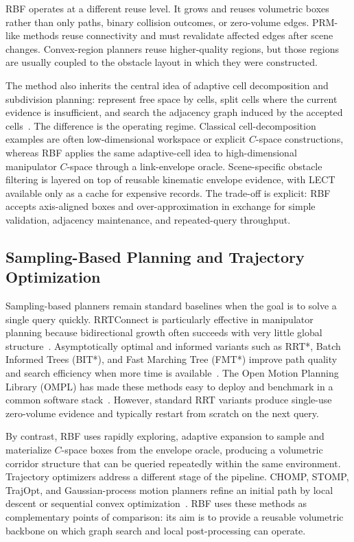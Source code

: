 \documentclass[journal]{IEEEtran}
\DeclareRobustCommand{\textsc}[1]{\textnormal{\MakeUppercase{#1}}}
\newcommand{\rbf}{\textsc{RBF}}
\begin{document}
\rbf{} operates at a different reuse level. It grows and reuses volumetric boxes
rather than only paths, binary collision outcomes, or zero-volume edges.
PRM-like methods reuse connectivity and must revalidate affected edges after
scene changes. Convex-region planners reuse higher-quality regions, but those
regions are usually coupled to the obstacle layout in which they were
constructed.

The method also inherits the central idea of adaptive cell decomposition and
subdivision planning: represent free space by cells, split cells where the
current evidence is insufficient, and search the adjacency graph induced by the
accepted cells~\cite{lozanoperez1983spatial,brooks1985subdivision}. The
difference is the operating regime. Classical cell-decomposition examples are
often low-dimensional workspace or explicit $C$-space constructions, whereas
\rbf{} applies the same adaptive-cell idea to high-dimensional manipulator
$C$-space through a link-envelope oracle. Scene-specific obstacle filtering
is layered on top of reusable kinematic envelope evidence, with LECT available
only as a cache for expensive records. The trade-off is explicit: \rbf{} accepts
axis-aligned boxes and over-approximation in exchange for simple validation,
adjacency maintenance, and repeated-query throughput.

\subsection{Sampling-Based Planning and Trajectory Optimization}

Sampling-based planners remain standard baselines when the goal is to solve
a single query quickly. RRTConnect is particularly effective in manipulator
planning because bidirectional growth often succeeds with very little global
structure~\cite{kuffner2000rrt}. Asymptotically optimal and
informed variants such as RRT*, Batch Informed Trees (BIT*), and Fast Marching
Tree (FMT*) improve path quality and search efficiency when more time is
available~\cite{karaman2011sampling,
gammell2015batch,gammell2018informed,janson2015fmt}. The Open Motion Planning
Library (OMPL) has made these methods easy to deploy and benchmark in a common
software stack~\cite{sucan2012ompl,
moll2015benchmarking}. However, standard RRT variants produce single-use
zero-volume evidence and typically restart from scratch on the next query.

By contrast, \rbf{} uses rapidly exploring, adaptive expansion to sample and
materialize $C$-space boxes from the envelope oracle, producing a volumetric
corridor structure that can be queried repeatedly within the same environment.
Trajectory optimizers address a different stage of the pipeline. CHOMP, STOMP,
TrajOpt, and Gaussian-process motion planners refine an initial path by local
descent or sequential convex optimization~\cite{ratliff2009chomp,
kalakrishnan2011stomp,schulman2014motion,mukadam2018gpmp2}. \rbf{} uses these
methods as complementary points of comparison: its aim is to provide a
reusable volumetric backbone on which graph search and local post-processing
can operate.
\end{document}
